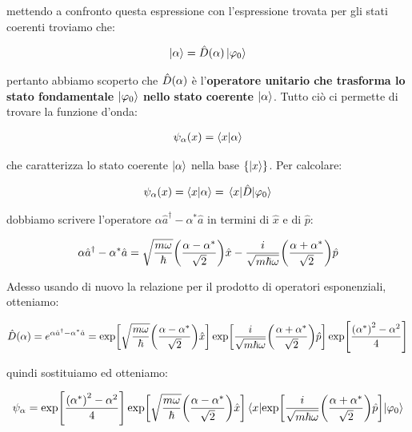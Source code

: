 	mettendo a confronto questa espressione con l'espressione trovata per gli stati coerenti troviamo che:
	
\begin{align*}
	\ket{\alpha} = \hat{D}\qty(\alpha) \ket{\varphi_0}
\end{align*}

	pertanto abbiamo scoperto che $\hat{D}\qty(\alpha)$ è l'\textbf{operatore unitario che trasforma lo stato fondamentale $\ket{\varphi_0}$ nello stato coerente $\ket{\alpha}$}. Tutto ciò ci permette di trovare la funzione d'onda:
	
\begin{align*}
	\psi_{\alpha}\qty(x) = \braket{x}{\alpha}
\end{align*}
	
	che caratterizza lo stato coerente $\ket{\alpha}$ nella base $\qty{\ket{x}}$. Per calcolare:
	
\begin{align*}
	\psi_{\alpha}\qty(x) =  \braket{x}{\alpha} = \mel{x}{\hat{D}}{\varphi_0}
\end{align*}
	
	dobbiamo scrivere l'operatore $\alpha \hat{a}^{\dagger} - \alpha^* \hat{a}$ in termini di $\hat{x}$ e di $\hat{p}$:
	
\begin{align*}
	\alpha \hat{a}^{\dagger} - \alpha^* \hat{a} =\sqrt{\frac{m \omega}{\hbar}} \qty(\frac{\alpha - \alpha^*}{\sqrt{2}}) \hat{x} - \frac{i}{\sqrt{m \hbar \omega}} \qty(\frac{\alpha + \alpha^*}{\sqrt{2}}) \hat{p}
\end{align*}

	Adesso usando di nuovo la relazione per il prodotto di operatori esponenziali, otteniamo:

\begin{align*}
	\hat{D}\qty(\alpha) = e^{\alpha \hat{a}^{\dagger} - \alpha^* \hat{a}} = \text{exp} \qty[\sqrt{\frac{m \omega}{\hbar}} \qty(\frac{\alpha - \alpha^*}{\sqrt{2}}) \hat{x} ] \, \text{exp} \qty[\frac{i}{\sqrt{m \hbar \omega}} \qty(\frac{\alpha + \alpha^*}{\sqrt{2}}) \hat{p}] \, \text{exp} \qty[ \frac{\qty(\alpha^*)^2 - \alpha^2}{4}]
\end{align*}

	quindi sostituiamo ed otteniamo:
	
\begin{align*}
	\psi_{\alpha} = \text{exp} \qty[ \frac{\qty(\alpha^*)^2 - \alpha^2}{4}] \, \text{exp} \qty[\sqrt{\frac{m \omega}{\hbar}} \qty(\frac{\alpha - \alpha^*}{\sqrt{2}}) \hat{x} ] \mel{x}{\text{exp} \qty[\frac{i}{\sqrt{m \hbar \omega}} \qty(\frac{\alpha + \alpha^*}{\sqrt{2}}) \hat{p}]}{\varphi_0}
\end{align*}

